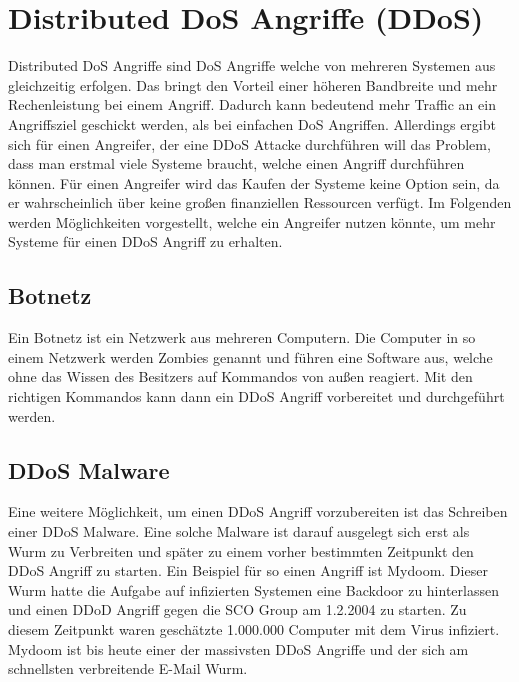 \chapter{Distributed DoS Angriffe (DDoS)}
\label{chap:kapitel5}

Distributed DoS Angriffe sind DoS Angriffe welche von mehreren Systemen aus gleichzeitig erfolgen. Das bringt den Vorteil einer höheren Bandbreite und mehr Rechenleistung bei einem Angriff. Dadurch kann bedeutend mehr Traffic an ein Angriffsziel geschickt werden, als bei einfachen DoS Angriffen. Allerdings ergibt sich für einen Angreifer, der eine DDoS Attacke durchführen will das Problem, dass man erstmal viele Systeme braucht, welche einen Angriff durchführen können. Für einen Angreifer wird das Kaufen der Systeme keine Option sein, da er wahrscheinlich über keine großen finanziellen Ressourcen verfügt. Im Folgenden werden Möglichkeiten vorgestellt, welche ein Angreifer nutzen könnte, um mehr Systeme für einen DDoS Angriff zu erhalten.

\section{Botnetz}

Ein Botnetz ist ein Netzwerk aus mehreren Computern. Die Computer in so einem Netzwerk werden Zombies genannt und führen eine Software aus, welche ohne das Wissen des Besitzers auf Kommandos von außen reagiert. Mit den richtigen Kommandos kann dann ein DDoS Angriff vorbereitet und durchgeführt werden.

\section{DDoS Malware}

Eine weitere Möglichkeit, um einen DDoS Angriff vorzubereiten ist das Schreiben einer DDoS Malware. Eine solche Malware ist darauf ausgelegt sich erst als Wurm zu Verbreiten und später zu einem vorher bestimmten Zeitpunkt den DDoS Angriff zu starten. Ein Beispiel für so einen Angriff ist Mydoom. Dieser Wurm hatte die Aufgabe auf infizierten Systemen eine Backdoor zu hinterlassen und einen DDoD Angriff gegen die SCO Group am 1.2.2004 zu starten. Zu diesem Zeitpunkt waren geschätzte 1.000.000 Computer mit dem Virus infiziert. Mydoom ist bis heute einer der massivsten DDoS Angriffe und der sich am schnellsten verbreitende E-Mail Wurm.